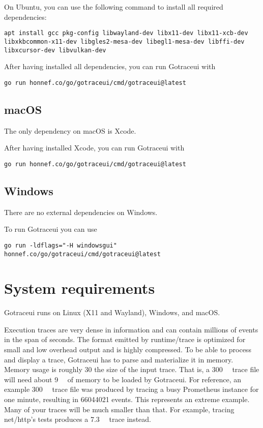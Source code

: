 \documentclass[10pt,letterpaper,oneside,openany,english]{memoir}
\newcommand{\code}[1]{{\ttfamily\mbox{#1}}}
\begin{document}
On Ubuntu, you can use the following command to install all required dependencies:

\begin{verbatim}
apt install gcc pkg-config libwayland-dev libx11-dev libx11-xcb-dev libxkbcommon-x11-dev libgles2-mesa-dev libegl1-mesa-dev libffi-dev libxcursor-dev libvulkan-dev
\end{verbatim}

After having installed all dependencies, you can run Gotraceui with

\begin{verbatim}
go run honnef.co/go/gotraceui/cmd/gotraceui@latest
\end{verbatim}

\section*{macOS}

The only dependency on macOS is Xcode.

After having installed Xcode, you can run Gotraceui with

\begin{verbatim}
go run honnef.co/go/gotraceui/cmd/gotraceui@latest
\end{verbatim}

\section*{Windows}

There are no external dependencies on Windows.

To run Gotraceui you can use

\begin{verbatim}
go run -ldflags="-H windowsgui" honnef.co/go/gotraceui/cmd/gotraceui@latest
\end{verbatim}

\chapter{System requirements}

Gotraceui runs on Linux (X11 and Wayland), Windows, and macOS.

Execution traces are very dense in information and can contain millions of events in the span of seconds.
The format emitted by \code{runtime/trace} is optimized for small and low overhead output and is highly compressed.
To be able to process and display a trace, Gotraceui has to parse and materialize it in memory.
Memory usage is roughly 30\texttimes{} the size of the input trace.
That is, a \qty{300}{\mega\byte} trace file will need about \qty{9}{\giga\byte} of memory to be loaded by Gotraceui.
For reference, an example \qty{300}{\mega\byte} trace file was produced by tracing a busy Prometheus instance for one minute,
resulting in \num{66044021} events.
This represents an extreme example.
Many of your traces will be much smaller than that.
For example, tracing \code{net/http}'s tests produces a \qty{7.3}{\mega\byte} trace instead.
\end{document}
